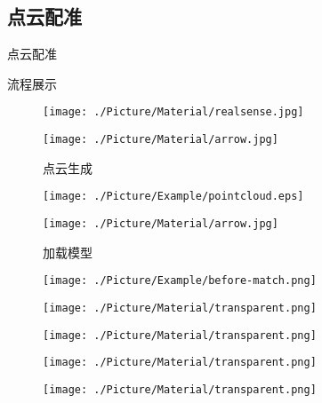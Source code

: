 \documentclass[xcolor=table,compress,blue]{beamer}
\begin{document}
  \subsection{点云配准}
	\begin{frame}{点云配准}
		\begin{exampleblock}{流程展示}
			\begin{figure}[htpb]
				\centering
				\begin{minipage}[b]{0.8in}
					\centerline{ \texttt{[image: ./Picture/Material/realsense.jpg]} }
				\end{minipage}
				\begin{minipage}[b]{0.8in}
					\centerline{ \quad}
					\centerline{ \texttt{[image: ./Picture/Material/arrow.jpg]} }
					\centerline{\tiny{点云生成}}
				\end{minipage}
				\begin{minipage}[b]{0.8in}
					\centerline{ \texttt{[image: ./Picture/Example/pointcloud.eps]} }
				\end{minipage}
				\begin{minipage}[b]{0.8in}
					\centerline{ \texttt{[image: ./Picture/Material/arrow.jpg]} }
					\centerline{\tiny{加载模型}}
				\end{minipage}
				\begin{minipage}[b]{0.8in}
					\centerline{ \texttt{[image: ./Picture/Example/before-match.png]} }
				\end{minipage}
			\end{figure}
			\vspace{-25pt}
			\begin{figure}[htpb]
				\centering
				\begin{minipage}[b]{0.8in}
					\centerline{ \texttt{[image: ./Picture/Material/transparent.png]} }
				\end{minipage}
				\begin{minipage}[b]{0.8in}
					\centerline{ \texttt{[image: ./Picture/Material/transparent.png]} }
				\end{minipage}
				\begin{minipage}[b]{0.8in}
					\centerline{ \texttt{[image: ./Picture/Material/transparent.png]} }
				\end{minipage}
				\begin{minipage}[b]{0.8in}
					\centerline{ \texttt{[image: ./Picture/Material/transparent.png]} }

\end{minipage}
\end{figure}
\end{exampleblock}
\end{frame}
\end{document}
